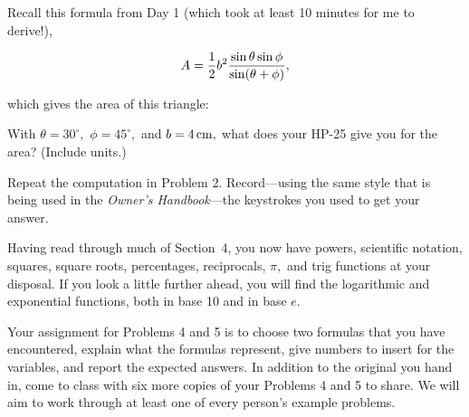 \bigskip

\nobreak\bigskip


\noindent Recall this formula from Day 1 (which took at least 10 minutes for me to derive!),

$$A={1\over 2} b^2 {\sin\theta \sin\phi \over \sin (\theta + \phi)},$$

\noindent which gives the area of this triangle:

\midinsert
\centerline{}
\endinsert
\nobreak\bigskip

\noindent With $\theta = 30^{\circ},$ $\phi = 45^{\circ},$ and $b = 4\thinspace{\rm cm},$ what does your HP-25 give you for the area? (Include units.)

\bigskip

\nobreak\bigskip

\noindent Repeat the computation in Problem 2. Record---using the same style that is being used in the {\it Owner's Handbook}---the keystrokes you used to get your answer.

\bigskip

\nobreak\bigskip

\noindent Having read through much of Section~4, you now have powers, scientific notation, squares, square roots, percentages, reciprocals, $\pi,$ and trig functions at your disposal. If you look a little
further ahead, you will find the logarithmic and exponential functions, both in base 10 and in base $e$.

Your assignment for Problems 4 and 5 is to choose two formulas that you have encountered, explain what the formulas represent, 
give numbers to insert for the variables, and report the expected answers. In addition to the original you hand in, come to class with six more copies of your Problems 4 and 5 to share. We will aim to work through at least one of every person's example problems.

\bye
